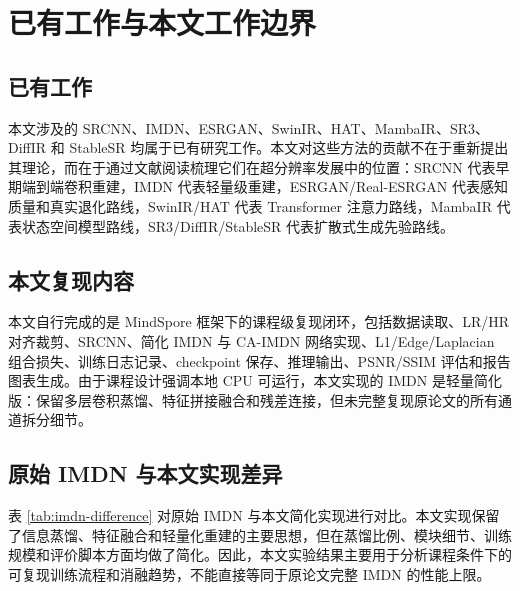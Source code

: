 \documentclass[bwprint]{report}
\begin{document}
\section{已有工作与本文工作边界}
\subsection{已有工作}
本文涉及的 SRCNN、IMDN、ESRGAN、SwinIR、HAT、MambaIR、SR3、DiffIR 和 StableSR 均属于已有研究工作。本文对这些方法的贡献不在于重新提出其理论，而在于通过文献阅读梳理它们在超分辨率发展中的位置：SRCNN 代表早期端到端卷积重建，IMDN 代表轻量级重建，ESRGAN/Real-ESRGAN 代表感知质量和真实退化路线，SwinIR/HAT 代表 Transformer 注意力路线，MambaIR 代表状态空间模型路线，SR3/DiffIR/StableSR 代表扩散式生成先验路线。

\subsection{本文复现内容}
本文自行完成的是 MindSpore 框架下的课程级复现闭环，包括数据读取、LR/HR 对齐裁剪、SRCNN、简化 IMDN 与 CA-IMDN 网络实现、L1/Edge/Laplacian 组合损失、训练日志记录、checkpoint 保存、推理输出、PSNR/SSIM 评估和报告图表生成。由于课程设计强调本地 CPU 可运行，本文实现的 IMDN 是轻量简化版：保留多层卷积蒸馏、特征拼接融合和残差连接，但未完整复现原论文的所有通道拆分细节。

\subsection{原始 IMDN 与本文实现差异}
表 \ref{tab:imdn-difference} 对原始 IMDN 与本文简化实现进行对比。本文实现保留了信息蒸馏、特征融合和轻量化重建的主要思想，但在蒸馏比例、模块细节、训练规模和评价脚本方面均做了简化。因此，本文实验结果主要用于分析课程条件下的可复现训练流程和消融趋势，不能直接等同于原论文完整 IMDN 的性能上限。
\end{document}
